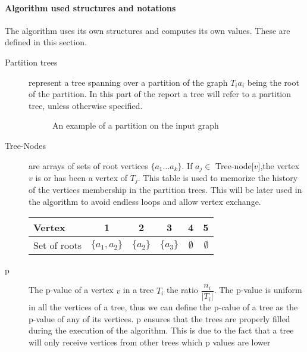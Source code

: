 \paragraph{Algorithm used structures and notations}               
\label{sec:structure}
The algorithm uses its own structures and computes its own values. These are defined in this section.
\begin{description}
\item[Partition trees] represent a tree spanning over a partition of the graph $T_i  a_i$ being 
  the root of the partition. In this part of the report  a tree will refer to a partition tree, unless otherwise specified.
   \begin{figure}[H]
	\begin{center}
	  
	\end{center}
	\caption{An example of a partition on the input graph}
      \end{figure}
\item [Tree-Nodes] are arrays of sets of root vertices $\{a_1 \ldots a_k\}$. If $a_j \in$ Tree-node[$v$],the vertex $v$ is or has been a vertex of $T_j$. This table is used to memorize the history of the vertices membership in the partition trees. This will be later used in the algorithm to avoid endless loops and allow vertex exchange.
\begin{table}[H]
\begin{center}
  \begin{tabular}{ | l | c | c | c | c | r | }
    \hline                       
    Vertex & 1 & 2 & 3 & 4 & 5 \\
    \hline
    Set of roots & $\{a_1, a_2\}$ & $\{a_2\}$ & $\{a_3\}$ &$ \emptyset$ & $\emptyset$ \\
    \hline  
  \end{tabular}
\end{center}
\end{table}

\item [p] The p-value of a vertex $v$ in a tree $T_i$ the ratio $\dfrac{n_i}{|T_i|}$. The p-value is uniform in all the vertices of a tree, thus we can define the p-calue of a tree as the p-value of any of its vertices. p ensures that the trees are properly filled during the execution of the algorithm. This is due to the fact that a tree will only receive vertices from other trees which p values are lower

\end{description}

